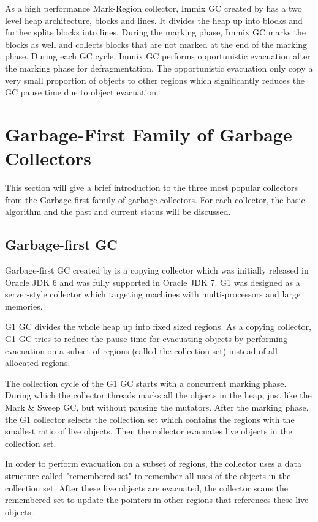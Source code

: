 As a high performance Mark-Region collector, Immix GC created by \cite{blackburn2008immix}
has a two level heap architecture, blocks and lines. It divides the heap up into blocks and
further splits blocks into lines. During the marking phase, Immix GC marks the blocks
as well and collects blocks that are not marked at the end of the marking phase.
During each GC cycle, Immix GC performs opportunistic evacuation after the marking phase for defragmentation.
The opportunistic evacuation only copy a very small proportion of objects to other regions which significantly
reduces the GC pause time due to object evacuation.

\section{Garbage-First Family of Garbage Collectors}
\label{sec:g1collectors}

This section will give a brief introduction to the three most popular collectors from the Garbage-first
family of garbage collectors. For each collector, the basic algorithm
and the past and current status will be discussed.

\subsection{Garbage-first GC}

Garbage-first GC created by \cite{detlefs2004garbage} is a copying collector which was initially released in Oracle JDK 6
and was fully supported in Oracle JDK 7. G1 was designed as a server-style collector
which targeting machines with multi-processors and large memories. 

G1 GC divides the whole heap up into fixed sized regions. 
As a copying collector, G1 GC tries to reduce the pause time for evacuating objects
by performing evacuation on a subset of regions (called the collection set) instead of
all allocated regions.

The collection cycle of the G1 GC starts with a concurrent marking phase.
During which the collector threads marks all the objects in the heap, just like the Mark \&
Sweep GC, but without pausing the mutators.
After the marking phase, the G1 collector selects the collection set which contains
the regions with the smallest ratio of live objects.
Then the collector evacuates live objects in the collection set.

In order to perform evacuation on a subset of regions, the collector uses a data structure
called "remembered set" to remember all uses of the objects in the collection set.
After these live objects are evacuated, the collector scans the remembered set to
update the pointers in other regions that references these live objects.

